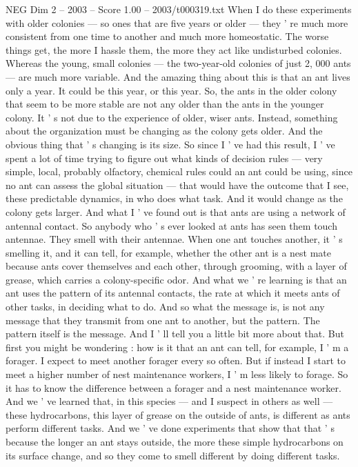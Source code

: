 \begin{textsample}{NEG Dim 2 – 2003 – Score 1.00 – 2003/t000319.txt}
When I do these experiments with older colonies — so ones that are five years or older — they ' re much more consistent from one time to another and much more homeostatic.
The worse things get, the more I hassle them, the more they act like undisturbed colonies.
Whereas the young, small colonies — the two-year-old colonies of just 2, 000 ants — are much more variable.
And the amazing thing about this is that an ant lives only a year.
It could be this year, or this year.
So, the ants in the older colony that seem to be more stable are not any older than the ants in the younger colony.
It ' s not due to the experience of older, wiser ants.
Instead, something about the organization must be changing as the colony gets older.
And the obvious thing that ' s changing is its size.
So since I ' ve had this result, I ' ve spent a lot of time trying to figure out what kinds of decision rules — very simple, local, probably olfactory, chemical rules could an ant could be using, since no ant can assess the global situation — that would have the outcome that I see, these predictable dynamics, in who does what task.
And it would change as the colony gets larger.
And what I ' ve found out is that ants are using a network of antennal contact.
So anybody who ' s ever looked at ants has seen them touch antennae.
They smell with their antennae.
When one ant touches another, it ' s smelling it, and it can tell, for example, whether the other ant is a nest mate because ants cover themselves and each other, through grooming, with a layer of grease, which carries a colony-specific odor.
And what we ' re learning is that an ant uses the pattern of its antennal contacts, the rate at which it meets ants of other tasks, in deciding what to do.
And so what the message is, is not any message that they transmit from one ant to another, but the pattern.
The pattern itself is the message.
And I ' ll tell you a little bit more about that.
But first you might be wondering : how is it that an ant can tell, for example, I ' m a forager.
I expect to meet another forager every so often.
But if instead I start to meet a higher number of nest maintenance workers, I ' m less likely to forage.
So it has to know the difference between a forager and a nest maintenance worker.
And we ' ve learned that, in this species — and I suspect in others as well — these hydrocarbons, this layer of grease on the outside of ants, is different as ants perform different tasks.
And we ' ve done experiments that show that that ' s because the longer an ant stays outside, the more these simple hydrocarbons on its surface change, and so they come to smell different by doing different tasks.

\end{textsample}
